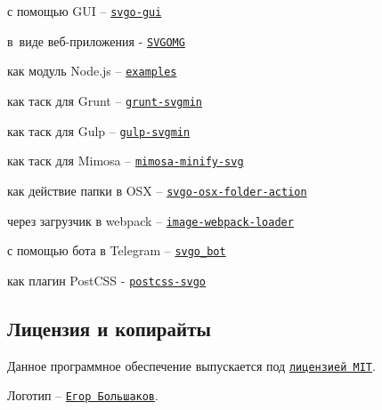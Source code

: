 \begin{DoxyItemize}
\item с помощью G\+UI – \href{https://github.com/svg/svgo-gui}{\tt svgo-\/gui}
\item в виде веб-\/приложения -\/ \href{https://jakearchibald.github.io/svgomg/}{\tt S\+V\+G\+O\+MG}
\item как модуль Node.\+js – \href{https://github.com/svg/svgo/tree/master/examples}{\tt examples}
\item как таск для Grunt – \href{https://github.com/sindresorhus/grunt-svgmin}{\tt grunt-\/svgmin}
\item как таск для Gulp – \href{https://github.com/ben-eb/gulp-svgmin}{\tt gulp-\/svgmin}
\item как таск для Mimosa – \href{https://github.com/dbashford/mimosa-minify-svg}{\tt mimosa-\/minify-\/svg}
\item как действие папки в O\+SX – \href{https://github.com/svg/svgo-osx-folder-action}{\tt svgo-\/osx-\/folder-\/action}
\item через загрузчик в webpack – \href{https://github.com/tcoopman/image-webpack-loader}{\tt image-\/webpack-\/loader}
\item с помощью бота в Telegram – \href{https://github.com/maksugr/svgo_bot}{\tt svgo\+\_\+bot}
\item как плагин Post\+C\+SS -\/ \href{https://github.com/ben-eb/postcss-svgo}{\tt postcss-\/svgo}
\end{DoxyItemize}

\subsection*{Лицензия и копирайты}

Данное программное обеспечение выпускается под \href{https://github.com/svg/svgo/blob/master/LICENSE}{\tt лицензией M\+IT}.

Логотип – \href{http://xizzzy.ru/}{\tt Егор Большаков}. 